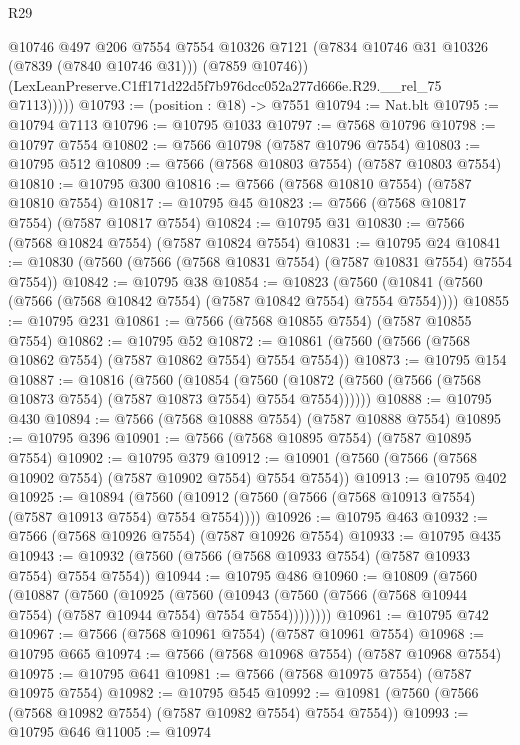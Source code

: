 \begin{lexlean}{R29}
\begin{coremodule}
              @10746
              @497
              @206
              @7554
              @7554
              @10326
              @7121
              (@7834 @10746 @31 @10326 (@7839 (@7840 @10746 @31)))
              (@7859 @10746))
            (LexLeanPreserve.C1ff171d22d5f7b976dcc052a277d666e.R29.__rel_75 @7113)))))
@10793 := (position : @18) -> @7551
@10794 := Nat.blt
@10795 := @10794 @7113
@10796 := @10795 @1033
@10797 := @7568 @10796
@10798 := @10797 @7554
@10802 := @7566 @10798 (@7587 @10796 @7554)
@10803 := @10795 @512
@10809 := @7566 (@7568 @10803 @7554) (@7587 @10803 @7554)
@10810 := @10795 @300
@10816 := @7566 (@7568 @10810 @7554) (@7587 @10810 @7554)
@10817 := @10795 @45
@10823 := @7566 (@7568 @10817 @7554) (@7587 @10817 @7554)
@10824 := @10795 @31
@10830 := @7566 (@7568 @10824 @7554) (@7587 @10824 @7554)
@10831 := @10795 @24
@10841 := @10830 (@7560 (@7566 (@7568 @10831 @7554) (@7587 @10831 @7554) @7554 @7554))
@10842 := @10795 @38
@10854 := @10823
    (@7560 (@10841 (@7560 (@7566 (@7568 @10842 @7554) (@7587 @10842 @7554) @7554 @7554))))
@10855 := @10795 @231
@10861 := @7566 (@7568 @10855 @7554) (@7587 @10855 @7554)
@10862 := @10795 @52
@10872 := @10861 (@7560 (@7566 (@7568 @10862 @7554) (@7587 @10862 @7554) @7554 @7554))
@10873 := @10795 @154
@10887 := @10816
    (@7560
      (@10854
        (@7560 (@10872 (@7560 (@7566 (@7568 @10873 @7554) (@7587 @10873 @7554) @7554 @7554))))))
@10888 := @10795 @430
@10894 := @7566 (@7568 @10888 @7554) (@7587 @10888 @7554)
@10895 := @10795 @396
@10901 := @7566 (@7568 @10895 @7554) (@7587 @10895 @7554)
@10902 := @10795 @379
@10912 := @10901 (@7560 (@7566 (@7568 @10902 @7554) (@7587 @10902 @7554) @7554 @7554))
@10913 := @10795 @402
@10925 := @10894
    (@7560 (@10912 (@7560 (@7566 (@7568 @10913 @7554) (@7587 @10913 @7554) @7554 @7554))))
@10926 := @10795 @463
@10932 := @7566 (@7568 @10926 @7554) (@7587 @10926 @7554)
@10933 := @10795 @435
@10943 := @10932 (@7560 (@7566 (@7568 @10933 @7554) (@7587 @10933 @7554) @7554 @7554))
@10944 := @10795 @486
@10960 := @10809
    (@7560
      (@10887
        (@7560
          (@10925
            (@7560
              (@10943 (@7560 (@7566 (@7568 @10944 @7554) (@7587 @10944 @7554) @7554 @7554))))))))
@10961 := @10795 @742
@10967 := @7566 (@7568 @10961 @7554) (@7587 @10961 @7554)
@10968 := @10795 @665
@10974 := @7566 (@7568 @10968 @7554) (@7587 @10968 @7554)
@10975 := @10795 @641
@10981 := @7566 (@7568 @10975 @7554) (@7587 @10975 @7554)
@10982 := @10795 @545
@10992 := @10981 (@7560 (@7566 (@7568 @10982 @7554) (@7587 @10982 @7554) @7554 @7554))
@10993 := @10795 @646
@11005 := @10974

\end{coremodule}
\end{lexlean}

